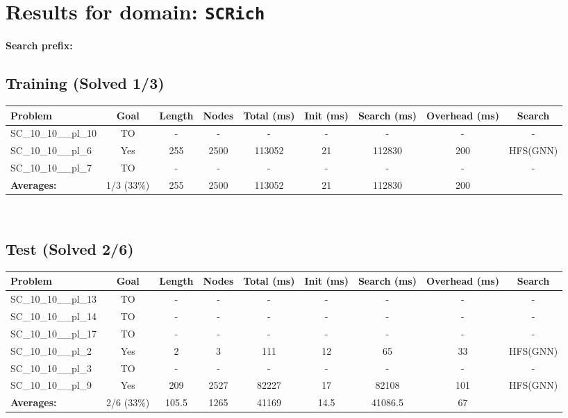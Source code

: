 \documentclass{article}
\begin{document}
\section*{Results for domain: \texttt{SCRich}}
\textbf{Search prefix:} 
\\[0.5cm]
\subsection*{Training (Solved 1/3)}
\begin{tabular}{lcccccccc}
\toprule
Problem & Goal & Length & Nodes & Total (ms) & Init (ms) & Search (ms) & Overhead (ms) & Search \\
\midrule
SC\_10\_10\_\_pl\_10 & TO & - & - & - & - & - & - & - \\
SC\_10\_10\_\_pl\_6 & Yes & 255 & 2500 & 113052 & 21 & 112830 & 200 & HFS(GNN) \\
SC\_10\_10\_\_pl\_7 & TO & - & - & - & - & - & - & - \\
\textbf{Averages:} & 1/3 (33\%) & 255 & 2500 & 113052 & 21 & 112830 & 200 & \\
\bottomrule
\end{tabular}
\\[0.7cm]
\subsection*{Test (Solved 2/6)}
\begin{tabular}{lcccccccc}
\toprule
Problem & Goal & Length & Nodes & Total (ms) & Init (ms) & Search (ms) & Overhead (ms) & Search \\
\midrule
SC\_10\_10\_\_pl\_13 & TO & - & - & - & - & - & - & - \\
SC\_10\_10\_\_pl\_14 & TO & - & - & - & - & - & - & - \\
SC\_10\_10\_\_pl\_17 & TO & - & - & - & - & - & - & - \\
SC\_10\_10\_\_pl\_2 & Yes & 2 & 3 & 111 & 12 & 65 & 33 & HFS(GNN) \\
SC\_10\_10\_\_pl\_3 & TO & - & - & - & - & - & - & - \\
SC\_10\_10\_\_pl\_9 & Yes & 209 & 2527 & 82227 & 17 & 82108 & 101 & HFS(GNN) \\
\textbf{Averages:} & 2/6 (33\%) & 105.5 & 1265 & 41169 & 14.5 & 41086.5 & 67 & \\
\bottomrule
\end{tabular}
\\[0.7cm]
\end{document}

